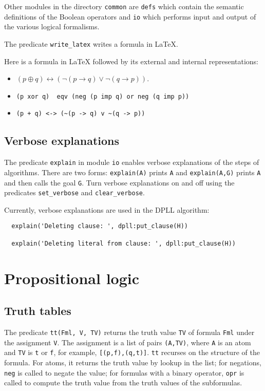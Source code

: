 \documentclass[11pt]{article}
\newcommand*{\p}[1]{\textup{\texttt{#1}}}
\begin{document}
Other modules in the directory \p{common} are \p{defs} which contain the
semantic definitions of the Boolean operators and \p{io} which performs
input and output of the various logical formalisms. 

The predicate \p{write\_latex} writes a formula in \LaTeX{}.

Here is a formula in \LaTeX{} followed by its external and internal representations:
\begin{itemize}
\item $(p \oplus q)  \leftrightarrow (\neg (p \rightarrow q) \vee \neg (q\rightarrow p) )$.
\item \verb+(p xor q)  eqv (neg (p imp q) or neg (q imp p))+
\item \verb=(p + q) <-> (~(p -> q) v ~(q -> p))=
\end{itemize}

\subsection{Verbose explanations}

The predicate \p{explain} in module \p{io} enables verbose explanations
of the steps of algorithms. There are two forms: \p{explain(A)} prints
\p{A} and \p{explain(A,G)} prints \p{A} and then calls the goal \p{G}.
Turn verbose explanations on and off using the predicates
\p{set\_verbose} and \p{clear\_verbose}.

Currently, verbose explanations are used in the DPLL algorithm:
\begin{verbatim}
  explain('Deleting clause: ', dpll:put_clause(H))

  explain('Deleting literal from clause: ', dpll:put_clause(H))
\end{verbatim}


\section{Propositional logic}

\subsection{Truth tables}\label{s.tt}

The predicate \p{tt(Fml, V, TV)} returns the truth value \p{TV} of
formula \p{Fml} under the assignment \p{V}. The assignment is a list of
pairs \p{(A,TV)}, where \p{A} is an atom and \p{TV} is \p{t} or \p{f},
for example, \p{[(p,f),(q,t)]}. \p{tt} recurses on the structure of the
formula. For atoms, it returns the truth value by lookup in the list;
for negations, \p{neg} is called to negate the value; for formulas with
a binary operator, \p{opr} is called to compute the truth value from the
truth values of the subformulas.
\end{document}
